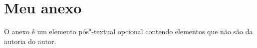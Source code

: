 \chapter{Meu anexo}

O anexo é um elemento pós"-textual opcional contendo elementos que não são da autoria do autor.
